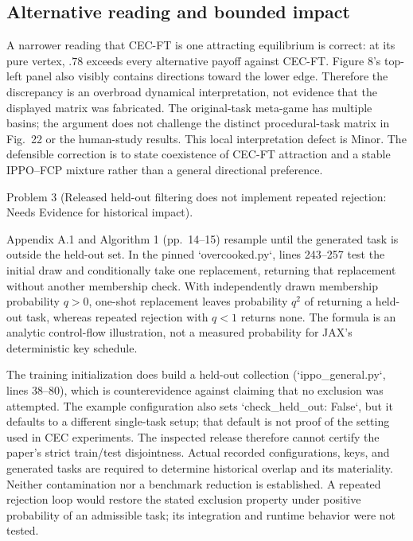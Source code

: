 \documentclass[10pt]{article}
\begin{document}
\subsection*{Alternative reading and bounded impact}
A narrower reading that CEC-FT is one attracting equilibrium is correct: at its pure vertex, \(.78\) exceeds every alternative payoff against CEC-FT. Figure 8’s top-left panel also visibly contains directions toward the lower edge. Therefore the discrepancy is an overbroad dynamical interpretation, not evidence that the displayed matrix was fabricated. The original-task meta-game has multiple basins; the argument does not challenge the distinct procedural-task matrix in Fig. 22 or the human-study results. This local interpretation defect is Minor. The defensible correction is to state coexistence of CEC-FT attraction and a stable IPPO–FCP mixture rather than a general directional preference.\par
Problem 3 (Released held-out filtering does not implement repeated rejection: Needs Evidence for historical impact).\par
Appendix A.1 and Algorithm 1 (pp. 14–15) resample until the generated task is outside the held-out set. In the pinned `overcooked.py`, lines 243–257 test the initial draw and conditionally take one replacement, returning that replacement without another membership check. With independently drawn membership probability \(q>0\), one-shot replacement leaves probability \(q^2\) of returning a held-out task, whereas repeated rejection with \(q<1\) returns none. The formula is an analytic control-flow illustration, not a measured probability for JAX’s deterministic key schedule.\par
The training initialization does build a held-out collection (`ippo\_general.py`, lines 38–80), which is counterevidence against claiming that no exclusion was attempted. The example configuration also sets `check\_held\_out: False`, but it defaults to a different single-task setup; that default is not proof of the setting used in CEC experiments. The inspected release therefore cannot certify the paper’s strict train/test disjointness. Actual recorded configurations, keys, and generated tasks are required to determine historical overlap and its materiality. Neither contamination nor a benchmark reduction is established. A repeated rejection loop would restore the stated exclusion property under positive probability of an admissible task; its integration and runtime behavior were not tested.\par
\end{document}
